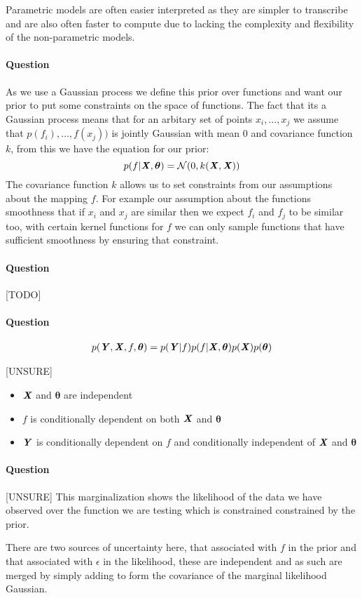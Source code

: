 \documentclass{article}
\newcounter{question}
\newcommand{\question}{\stepcounter{question}\paragraph{Question \thequestion}}
\newcommand{\mat}[1]{\textbf{\textit{#1}}}
\begin{document}
Parametric models are often easier interpreted as they are simpler to transcribe and are also often faster to compute due to lacking the complexity and flexibility of the non-parametric models.
\question As we use a Gaussian process we define this prior over functions and want our prior to put some constraints on the space of functions. The fact that its a Gaussian process means that for an arbitary set of points $x_i, \ldots, x_j$ we assume that $p(f_i), \ldots,f(x_j))$ is jointly Gaussian with mean $0$ and covariance function $k$, from this we have the equation for our prior:
$$
	p(f|\mat{X},\bm{\theta}) = \mathcal{N}(0, k(\mat{X},\mat{X}))
$$
The covariance function $k$ allows us to set constraints from our assumptions about the mapping $f$. For example our assumption about the functions smoothness that if $x_i$ and $x_j$ are similar then we expect $f_i$ and $f_j$ to be similar too, with certain kernel functions for $f$ we can only sample functions that have sufficient smoothness by ensuring that constraint.
\question [TODO]
\question
\begin{align*}
	p(\mat{Y},\mat{X},f,\bm{\theta}) = p(\mat{Y}|f)p(f|\mat{X},\bm{\theta})p(\mat{X})p(\bm{\theta})
\end{align*}
\begin{center}
\end{center}
[UNSURE]
\begin{itemize}
	\item $\mat{X}$ and $\bm{\theta}$ are independent
	\item $f$ is conditionally dependent on both $\mat{X}$ and $\bm{\theta}$
	\item $\mat{Y}$ is conditionally dependent on $f$ and conditionally independent of $\mat{X}$ and $\bm{\theta}$
\end{itemize}
\question [UNSURE] This marginalization shows the likelihood of the data we have observed over the function we are testing which is constrained constrained by the prior.

There are two sources of uncertainty here, that associated with $f$ in the prior and that associated with $\epsilon$ in the likelihood, these are independent and as such are merged by simply adding to form the covariance of the marginal likelihood Gaussian.
\end{document}
